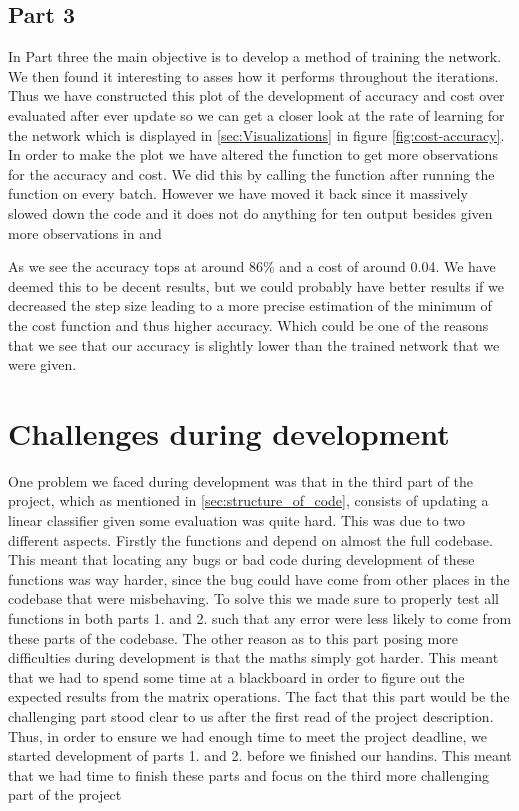 \documentclass[a4paper,oneside,article,english]{memoir}
\begin{document}
\subsection{Part 3}
In Part three the main objective is to develop a method of training the network. We then found it interesting to asses how it performs throughout the iterations. Thus we have constructed this plot of the development of accuracy and cost over evaluated after ever update so we can get a closer look at the rate of learning for the network which is displayed in \ref{sec:Visualizations} in figure \ref{fig:cost-accuracy}. In order to make the plot we have altered the  function to get more observations for the accuracy and cost. We did this by calling the  function after running the  function on every batch. However we have moved it back since it massively slowed down the code and it does not do anything for ten output besides given more observations in  and 

As we see the accuracy tops at around $86\%$ and a cost of around 0.04. We have deemed this to be decent results, but we could probably have better results if we decreased the step size leading to a more precise estimation of the minimum of the cost function and thus higher accuracy. Which could be one of the reasons that we see that our accuracy is slightly lower than the trained network that we were given.


\section{Challenges during development}  
\label{sec:challenges_during_development}

One problem we faced during development was that in the third part of the
project, which as mentioned in \cref{sec:structure_of_code}, consists of
updating a linear classifier given some evaluation was quite hard. This was due
to two different aspects. Firstly the functions  and
 depend on almost the full codebase. This meant that
locating any bugs or bad code during development of these functions was way
harder, since the bug could have come from other places in the codebase that
were misbehaving. To solve this we made sure to properly test all functions in
both parts 1. and 2. such that any error were less likely to come from these
parts of the codebase. The other reason as to this part posing more
difficulties during development is that the maths simply got harder. This meant
that we had to spend some time at a blackboard in order to figure out the
expected results from the matrix operations. The fact that this part would be
the challenging part stood clear to us after the first read of the project
description. Thus, in order to ensure we had enough time to meet the project
deadline, we started development of parts 1. and 2. before we finished our
handins. This meant that we had time to finish these parts and focus on the
third more challenging part of the project 
\end{document}
